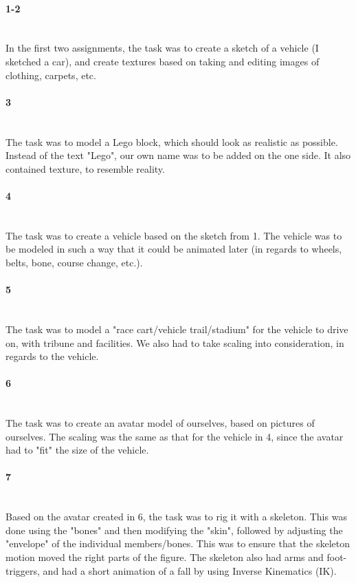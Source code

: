 \paragraph{ 1-2} ~\\
In the first two assignments, the task was to create a sketch of a vehicle (I sketched a car), and create textures based on taking  and editing images of clothing, carpets, etc. 

\paragraph{ 3} ~\\
The task was to model a Lego block, which should look as realistic as possible. 
Instead of the text "Lego", our own name was to be added on the one side. 
It also contained texture, to resemble reality. 

\paragraph{ 4} ~\\
The task was to create a vehicle based on the sketch from  1. 
The vehicle was to be modeled in such a way that it could be animated later (in regards to wheels, belts, bone, course change, etc.).

\paragraph{ 5} ~\\
The task was to model a "race cart/vehicle trail/stadium" for the vehicle to drive on, with tribune and facilities.
We also had to take scaling into consideration, in regards to the vehicle. 

\paragraph{ 6} ~\\
The task was to create an avatar model of ourselves, based on pictures of ourselves.
The scaling was the same as that for the vehicle in  4, since the avatar had to "fit" the size of the vehicle.

\paragraph{ 7} ~\\
Based on the avatar created in  6, the task was to rig it with a skeleton. 
This was done using the "bones" and then modifying the "skin", followed by adjusting the "envelope" of the individual members/bones.
This was to ensure that the skeleton motion moved the right parts of the figure.
The skeleton also had arms and foot-triggers, and had a short animation of a fall by using Inverse Kinematics (IK).

